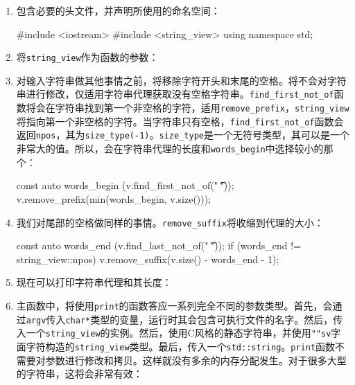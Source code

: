 \begin{enumerate}
\item 包含必要的头文件，并声明所使用的命名空间：

\begin{codebox}[cpp]
#include <iostream>
#include <string_view>
using namespace std; 
\end{codebox}

\item 将\texttt{string\_view}作为函数的参数：

\begin{codebox}[cpp]
void print(string_view v)
{ 
\end{codebox}

\item 对输入字符串做其他事情之前，将移除字符开头和末尾的空格。将不会对字符串进行修改，仅适用字符串代理获取没有空格字符串。\texttt{find\_first\_not\_of}函数将会在字符串找到第一个非空格的字符，适用\texttt{remove\_prefix}，\texttt{string\_view}将指向第一个非空格的字符。当字符串只有空格，\texttt{find\_first\_not\_of}函数会返回\texttt{npos}，其为\texttt{size\_type(-1)}。\texttt{size\_type}是一个无符号类型，其可以是一个非常大的值。所以，会在字符串代理的长度和\texttt{words\_begin}中选择较小的那个：

\begin{codebox}[cpp]
    const auto words_begin (v.find_first_not_of(" \t\n"));
    v.remove_prefix(min(words_begin, v.size()));
\end{codebox}

\item 我们对尾部的空格做同样的事情。\texttt{remove\_suffix}将收缩到代理的大小：

\begin{codebox}[cpp]
    const auto words_end (v.find_last_not_of(" \t\n"));
    if (words_end != string_view::npos) {
        v.remove_suffix(v.size() - words_end - 1);
    } 
\end{codebox}

\item 现在可以打印字符串代理和其长度：

\begin{codebox}[cpp]
    cout << "length: " << v.length()
         << " [" << v << "]\n";
}
\end{codebox}

\item 主函数中，将使用\texttt{print}的函数答应一系列完全不同的参数类型。首先，会通过\texttt{argv}传入\texttt{char*}类型的变量，运行时其会包含可执行文件的名字。然后，传入一个\texttt{string\_view}的实例。然后，使用C风格的静态字符串，并使用\texttt{""sv}字面字符构造的\texttt{string\_view}类型。最后，传入一个\texttt{std::string}。\texttt{print}函数不需要对参数进行修改和拷贝。这样就没有多余的内存分配发生。对于很多大型的字符串，这将会非常有效：


\end{enumerate}
